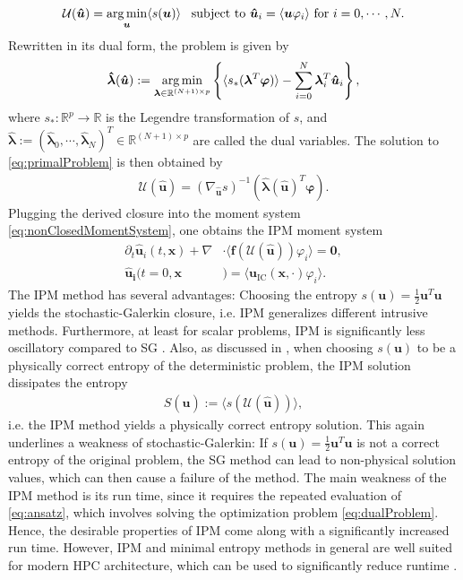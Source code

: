 \begin{align}\label{eq:primalProblem}
\mathcal{U}(\bm{\hat u}) = \operatorname*{arg\,min}_{\bm u} \langle s(\bm u) \rangle \enskip \text{ subject to } \bm{\hat u}_i = \langle \bm u \varphi_i \rangle \text{ for } i = 0,\cdots,N.
\end{align}
Rewritten in its dual form, the problem is given by
\begin{align}\label{eq:dualProblem}
 \bm{\hat \lambda}(\bm{\hat u}) := \operatorname*{arg\,min}_{\bm{\lambda} \in \mathbb{R}^{(N+1) \times p}}
  \left\{\langle s_*(\bm{\lambda}^T \bm\varphi)\rangle - \sum_{i=0}^{N}\bm{\lambda}_i^T \bm{\hat u}_i\right\},
\end{align}
where $s_*:\mathbb{R}^p\to\mathbb{R}$ is the Legendre transformation of $s$, and $\bm{ \hat\lambda}:=(\bm{\hat{\lambda}}_0,\cdots,\bm{\hat{\lambda}}_N)^T\in \mathbb{R}^{(N+1) \times p}$ are called the dual variables. The solution to \eqref{eq:primalProblem} is then obtained by
\begin{align}\label{eq:ansatz}
 \mathcal{U}(\bm{\hat u}) = \left( \nabla_{\bm{\hat u}} s \right)^{-1}(\bm{\hat{\lambda}}(\bm{\hat u})^T \bm{\varphi}).
\end{align}
Plugging the derived closure into the moment system \eqref{eq:nonClosedMomentSystem}, one obtains the IPM moment system
\begin{subequations}\label{eq:IPMmomentSystem}
\begin{align}
\partial_t \bm{\hat u}_i(t,\bm{x}) + \nabla&\cdot\langle\bm{f}(\mathcal{U}(\bm{\hat u})) \varphi_i\rangle = \bm{0}, \\
\bm{\hat u_i}(t=0,\bm{x}&) = \langle\bm{u}_{\text{IC}}(\bm{x},\cdot)\varphi_i\rangle.
\end{align}
\end{subequations}
The IPM method has several advantages: Choosing the entropy $s(\bm{u}) = \frac{1}{2}\bm{u}^T\bm{u}$ yields the stochastic-Galerkin closure, i.e. IPM generalizes different intrusive methods. Furthermore, at least for scalar problems, IPM is significantly less oscillatory compared to SG \cite{kusch2017maximum}. Also, as discussed in \cite{poette2009uncertainty}, when choosing $s(\bm u)$ to be a physically correct entropy of the deterministic problem, the IPM solution dissipates the entropy
\begin{align*}
S(\bm{\hat u}) := \langle s( \mathcal{U}(\bm{\hat u}))\rangle,
\end{align*}
i.e. the IPM method yields a physically correct entropy solution. This again underlines a weakness of stochastic-Galerkin: If $s(\bm{u}) = \frac{1}{2}\bm{u}^T\bm{u}$ is not a correct entropy of the original problem, the SG method can lead to non-physical solution values, which can then cause a failure of the method. The main weakness of the IPM method is its run time, since it requires the repeated evaluation of \eqref{eq:ansatz}, which involves solving the optimization problem \eqref{eq:dualProblem}. Hence, the desirable properties of IPM come along with a significantly increased run time. However, IPM and minimal entropy methods in general are well suited for modern HPC architecture, which can be used to significantly reduce runtime \cite{garrett2015optimization}. 

